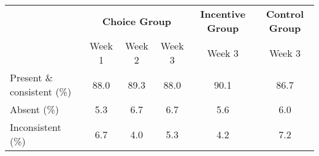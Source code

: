 \begin{tabular}{l c c c | c | c }\toprule& \multicolumn{3}{c}{\textbf{Choice Group}} & \multicolumn{1}{c}{\textbf{Incentive Group}} & \multicolumn{1}{c}{\textbf{Control Group}} \\\cmidrule(r){2-4} \cmidrule(r){5-5} \cmidrule(r){6-6}& Week 1 & Week 2 & Week 3 & Week 3 & Week 3 \\ \midrule Present \& consistent (\%) &    88.0&   89.3&   88.0&   90.1&   86.7\\Absent (\%) &     5.3&    6.7&    6.7&    5.6&    6.0\\Inconsistent (\%) &     6.7&    4.0&    5.3&    4.2&    7.2\\\bottomrule\end{tabular}
